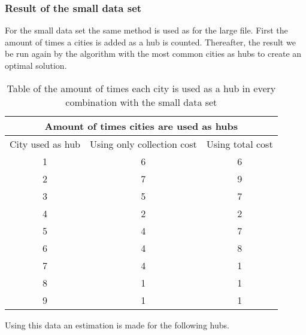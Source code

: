 \documentclass{article}
\begin{document}
        \subsubsection{Result of the small data set}
            For the small data set the same method is used as for the large file. First the amount of times a cities is added as a hub is counted. Thereafter, the result we be run again by the algorithm with the most common cities as hubs to create an optimal solution.
            
             \begin{table}[h!]
                \begin{center}
                \begin{tabular}{||c|c|c||}
                    \hline
                    \multicolumn{3}{||c||}{Amount of times cities are used as hubs} \\
                    \hline
                    City used as hub & Using only collection cost & Using total cost\\
                    \hline
                    1 & 6 & 6 \\
                    \hline
                    2 & 7   & 9\\
                    \hline
                    3& 5& 7\\
                    \hline
                    4  & 2 & 2 \\
                    \hline
                    5 & 4 & 7\\
                    \hline
                    6 & 4 & 8   \\
                    \hline
                    7 & 4& 1 \\
                    \hline
                    8 & 1 & 1 \\
                    \hline
                    9 &  1& 1 \\
                    \hline
                \end{tabular}
                \end{center}
                \caption{Table of the amount of times each city is used as a hub in every combination with the small data set}
                \label{amount of times hubs are used in collection small} 
            \end{table}
            
            Using this data an estimation is made for the following hubs.
            
\end{document}
